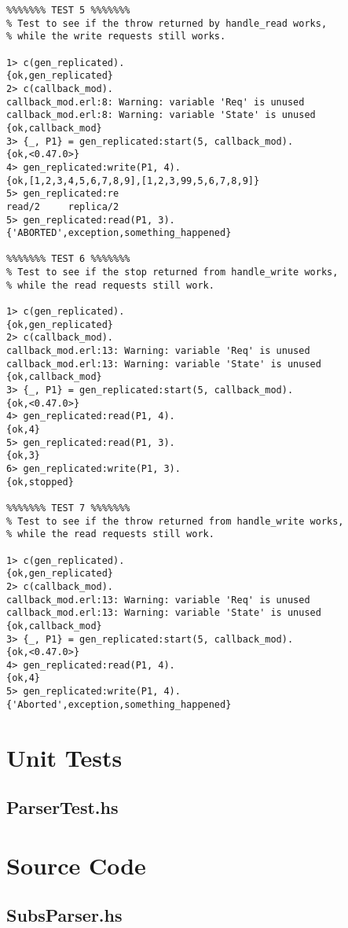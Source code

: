 \documentclass[a4paper]{article}
\begin{document}
\begin{verbatim}
%%%%%%% TEST 5 %%%%%%%
% Test to see if the throw returned by handle_read works,
% while the write requests still works.

1> c(gen_replicated).
{ok,gen_replicated}
2> c(callback_mod).
callback_mod.erl:8: Warning: variable 'Req' is unused
callback_mod.erl:8: Warning: variable 'State' is unused
{ok,callback_mod}
3> {_, P1} = gen_replicated:start(5, callback_mod).
{ok,<0.47.0>}
4> gen_replicated:write(P1, 4).
{ok,[1,2,3,4,5,6,7,8,9],[1,2,3,99,5,6,7,8,9]}
5> gen_replicated:re
read/2     replica/2
5> gen_replicated:read(P1, 3).
{'ABORTED',exception,something_happened}

%%%%%%% TEST 6 %%%%%%%
% Test to see if the stop returned from handle_write works,
% while the read requests still work.

1> c(gen_replicated).
{ok,gen_replicated}
2> c(callback_mod).
callback_mod.erl:13: Warning: variable 'Req' is unused
callback_mod.erl:13: Warning: variable 'State' is unused
{ok,callback_mod}
3> {_, P1} = gen_replicated:start(5, callback_mod).
{ok,<0.47.0>}
4> gen_replicated:read(P1, 4).
{ok,4}
5> gen_replicated:read(P1, 3).
{ok,3}
6> gen_replicated:write(P1, 3).
{ok,stopped}

%%%%%%% TEST 7 %%%%%%%
% Test to see if the throw returned from handle_write works,
% while the read requests still work.

1> c(gen_replicated).
{ok,gen_replicated}
2> c(callback_mod).
callback_mod.erl:13: Warning: variable 'Req' is unused
callback_mod.erl:13: Warning: variable 'State' is unused
{ok,callback_mod}
3> {_, P1} = gen_replicated:start(5, callback_mod).
{ok,<0.47.0>}
4> gen_replicated:read(P1, 4).
{ok,4}
5> gen_replicated:write(P1, 4).
{'Aborted',exception,something_happened}
\end{verbatim}

\newpage
\section{Unit Tests}
\subsection{ParserTest.hs}\label{ParserTest}


\newpage
\section{Source Code}
\subsection{SubsParser.hs}\label{src_Parser}

\end{document}
